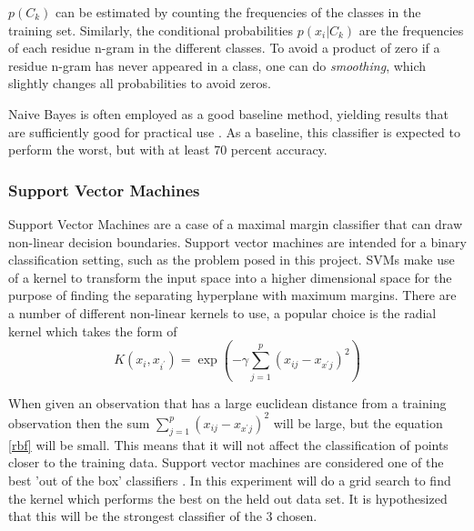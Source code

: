\documentclass[10pt,letterpaper]{article}
\begin{document}
	\noindent $p(C_k)$ can be estimated by counting the frequencies of the classes in the training set. Similarly, the conditional probabilities $p(x_i|C_k)$ are the frequencies of each residue n-gram in the different classes. To avoid a product of zero if a residue n-gram has never appeared in a class, one can do \textit{smoothing}, which slightly changes all probabilities to avoid zeros. 
	
	Naive Bayes is often employed as a good baseline method, yielding results that are sufficiently good for practical use \cite{jurafsky}. As a baseline, this classifier is expected to perform the worst, but with at least 70 percent accuracy.
	
	\subsubsection*{Support Vector Machines}
	
	Support Vector Machines are a case of a maximal margin classifier that can draw non-linear decision boundaries. Support vector machines are intended for a binary classification setting, such as the problem posed in this project. SVMs make use of a kernel to transform the input space into a higher dimensional space for the purpose of finding the separating hyperplane with maximum margins. There are a number of different non-linear kernels to use, a popular choice is the radial kernel \cite{yellowbook} which takes the form of 
	\begin{equation}
	\label{rbf}
	K(x_i, x_{i^\prime}) = \exp({-\gamma \sum_{j=1}^{p}({x_{ij}-x_{x^\prime j}})^2})
	\end{equation}
	
	When given an observation that has a large euclidean distance from a training observation then the sum $\sum_{j=1}^{p}({x_{ij}-x_{x^\prime j}})^2$ will be large, but the equation \ref{rbf} will be small. This means that it will not affect the classification of points closer to the training data. Support vector machines are considered one of the best 'out of the box' classifiers \cite{yellowbook}. In this experiment will do a grid search to find the kernel which performs the best on the held out data set. It is hypothesized that this will be the strongest classifier of the 3 chosen. 
	
\end{document}
